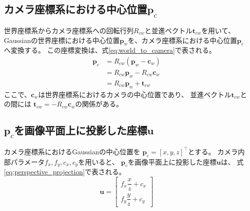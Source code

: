 \documentclass[dvipdfmx]{jlreq}
\begin{document}
\subsection{カメラ座標系における中心位置$\bm{p}_{c}$}
世界座標系からカメラ座標系への回転行列$R_{cw}$と並進ベクトル$\bm{t}_{cw}$を用いて、
Gaussianの世界座標における中心位置$\bm{p}_{w}$を、カメラ座標系における中心位置$\bm{p}_{c}$へ変換する。
この座標変換は、式\eqref{eq:world_to_camera}で表される。
\begin{equation}
    \begin{aligned}
        \bm{p}_{c} &= R_{cw}\left(\bm{p}_{w}-\bm{c}_w\right) \\
        &= R_{cw}\bm{p}_{w}-R_{cw}\bm{c}_w \\
        &= R_{cw}\bm{p}_{w}+\bm{t}_{cw}
    \end{aligned}
    \label{eq:world_to_camera}
\end{equation}
ここで、$\bm{c}_w$は世界座標系におけるカメラの中心位置であり、
並進ベクトル$\bm{t}_{cw}$との間には
$\bm{t}_{cw}=-R_{cw}\bm{c}_w$の関係がある。

\subsection{$\bm{p}_{c}$を画像平面上に投影した座標$\bm{u}$}
カメラ座標系におけるGaussianの中心位置を
$\bm{p}_{c}=[x,y,z]^\top$とする。
カメラ内部パラメータ$f_x,f_y,c_x,c_y$を用いると、
$\bm{p}_{c}$を画像平面上に投影した座標$\bm{u}$は、
式\eqref{eq:perspective_projection}で表される。
\begin{equation}
    \bm{u} = \begin{bmatrix} f_x\dfrac{x}{z}+c_x \\[1.5ex] f_y\dfrac{y}{z}+c_y \end{bmatrix}
    \label{eq:perspective_projection}
\end{equation}
\end{document}
